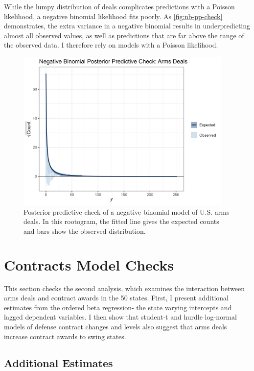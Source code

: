 \documentclass[12pt]{article}
\begin{document}
While the lumpy distribution of deals complicates predictions with a Poisson likelihood, a negative binomial likelihood fits poorly. 
As \autoref{fig:nb-pp-check} demonstrates, the extra variance in a negative binomial results in underpredicting almost all observed values, as well as predictions that are far above the range of the observed data. 
I therefore rely on models with a Poisson likelihood. 


\begin{figure}[htpb]
	\centering
		\includegraphics[width=0.95\textwidth]{nb-pp-check.png}
	\caption{Posterior predictive check of a negative binomial model of U.S. arms deals. In this rootogram, the fitted line gives the expected counts and bars show the observed distribution.}
	\label{fig:nb-pp-check}
\end{figure}

\newpage

\section{Contracts Model Checks} 

This section checks the second analysis, which examines the interaction between arms deals and contract awards in the 50 states. 
First, I present additional estimates from the ordered beta regression- the state varying intercepts and lagged dependent variables. 
I then show that student-t and hurdle log-normal models of defense contract changes and levels also suggest that arms deals increase contract awards to swing states. 


\subsection{Additional Estimates}
\end{document}
